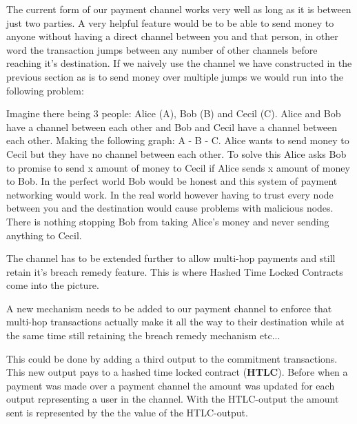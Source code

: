 The current form of our payment channel works very well as long as it is between just two parties. A very helpful feature would be to be able to send money to anyone without having a direct channel between you and that person, in other word the transaction jumps between any number of other channels before reaching it's destination. If we naively use the channel we have constructed in the previous section as is to send money over multiple jumps we would run into the following problem:

Imagine there being 3 people: Alice (A), Bob (B) and Cecil (C). Alice and Bob have a channel between each other and Bob and Cecil have a channel between each other. Making the following graph: A - B - C. Alice wants to send money to Cecil but they have no channel between each other. To solve this Alice asks Bob to promise to send x amount of money to Cecil if Alice sends x amount of money to Bob. In the perfect world Bob would be honest and this system of payment networking would work. In the real world however having to trust every node between you and the destination would cause problems with malicious nodes. There is nothing stopping Bob from taking Alice's money and never sending anything to Cecil. 

The channel has to be extended further to allow multi-hop payments and still retain it's breach remedy feature. This is where Hashed Time Locked Contracts come into the picture. 

A new mechanism needs to be added to our payment channel to enforce that multi-hop transactions actually make it all the way to their destination while at the same time still retaining the breach remedy mechanism etc... 

This could be done by adding a third output to the commitment transactions. This new output pays to a hashed time locked contract (\textbf{HTLC}).\cite{antonopoulos_2017}\cite{lightningnetwork_2019} Before when a payment was made over a payment channel the amount was updated for each output representing a user in the channel. With the HTLC-output the amount sent is represented by the the value of the HTLC-output.\cite{lightningnetwork_2019}\cite{bolt}

